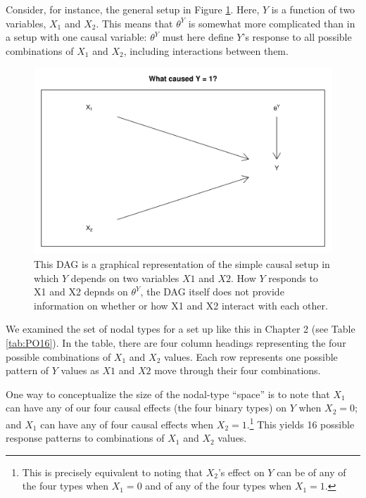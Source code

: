 \documentclass[
  12pt,
]{book}
\begin{document}
Consider, for instance, the general setup in Figure \ref{fig:attribquery}. Here, \(Y\) is a function of two variables, \(X_1\) and \(X_2\). This means that \(\theta^Y\) is somewhat more complicated than in a setup with one causal variable: \(\theta^Y\) must here define \(Y\)'s response to all possible combinations of \(X_1\) and \(X_2\), including interactions between them.

\begin{figure}

{\centering \includegraphics[width=0.6\linewidth]{ii_files/figure-latex/attribquery-1} 

}

\caption{This DAG is a graphical representation of the simple causal setup in which $Y$ depends on two variables $X1$ and $X2$. How $Y$ responds to X1 and X2 depnds on $\theta^Y$, the DAG itself does not provide information on whether or how X1 and X2 interact with each other.}\label{fig:attribquery}
\end{figure}

We examined the set of nodal types for a set up like this in Chapter 2 (see Table \ref{tab:PO16}). In the table, there are four column headings representing the four possible combinations of \(X_1\) and \(X_2\) values. Each row represents one possible pattern of \(Y\) values as \(X1\) and \(X2\) move through their four combinations.

One way to conceptualize the size of the nodal-type ``space'' is to note that \(X_1\) can have any of our four causal effects (the four binary types) on \(Y\) when \(X_2=0\); and \(X_1\) can have any of four causal effects when \(X_2=1\).\footnote{This is precisely equivalent to noting that \(X_2\)'s effect on \(Y\) can be of any of the four types when \(X_1=0\) and of any of the four types when \(X_1=1\).} This yields 16 possible response patterns to combinations of \(X_1\) and \(X_2\) values.
\end{document}

